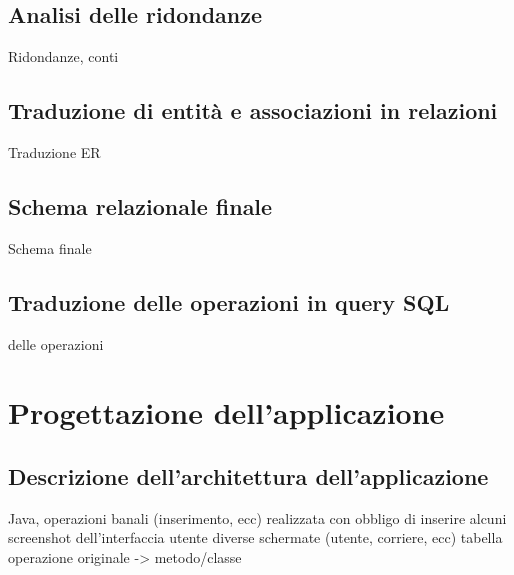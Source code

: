 \documentclass[a4paper,12pt]{report}
\begin{document}
\section{Analisi delle ridondanze}
Ridondanze, conti
\section{Traduzione di entità e associazioni in relazioni}
Traduzione ER
\section{Schema relazionale finale}
Schema finale
\section{Traduzione delle operazioni in query SQL}
delle operazioni

\chapter{Progettazione dell'applicazione}
\section{Descrizione dell'architettura dell'applicazione}
Java, operazioni banali (inserimento, ecc)
realizzata con obbligo di inserire alcuni screenshot dell'interfaccia utente
diverse schermate (utente, corriere, ecc)
tabella operazione originale -> metodo/classe
\end{document}
